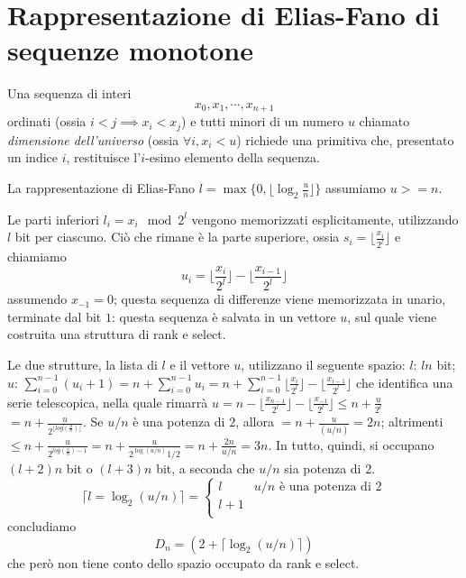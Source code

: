 \section{Rappresentazione di Elias-Fano di sequenze monotone}
Una sequenza di interi
$$
	x_0, x_1, \cdots, x_{n+1}
$$
ordinati (ossia $i < j \implies x_i < x_j$) e tutti minori di un numero $u$ chiamato
\textit{dimensione dell'universo} (ossia $\forall i, x_i < u$) richiede una primitiva che, presentato
un indice $i$, restituisce l'$i$-esimo elemento della sequenza.

La rappresentazione di Elias-Fano
$l = \max\{0, \lfloor \log_2{\frac{u}{n}}\rfloor\}$ assumiamo $u >= n$.

Le parti inferiori $l_i = x_i \mod 2^l$ vengono memorizzati esplicitamente, utilizzando $l$ bit per ciascuno.
Ciò che rimane è la parte superiore, ossia $s_i = \lfloor{\frac{x_{i}}{2^l}}\rfloor$ e chiamiamo
$$
	u_i = \lfloor{\frac{x_i}{2^l}}\rfloor -\lfloor{\frac{x_{i-1}}{2^l}}\rfloor
$$
assumendo $x_{-1} = 0$; questa sequenza di differenze viene memorizzata in unario, terminate dal bit $1$:
questa sequenza è salvata in un vettore $u$, sul quale viene costruita una struttura di rank e select.

Le due strutture, la lista di $l$ e il vettore $u$, utilizzano il seguente spazio:
$l$: $ln$ bit; $u$: $\sum_{i = 0}^{ n-1} (u_i + 1) = n + \sum_{i = 0}^{n-1} u_i = n + \sum_{i = 0}^{n-1} \lfloor{\frac{x_i}{2^l}}\rfloor -\lfloor{\frac{x_{i-1}}{2^l}}\rfloor$
che identifica una serie telescopica, nella quale rimarrà $u = n - \lfloor{\frac{x_{n-1}}{2^l}}\rfloor -\lfloor{\frac{x_{-1}}{2^l}}\rfloor \leq n + \frac{u}{2^l}$
$ = n + \frac{u}{2^{\lfloor log(\frac{u}{n})\rfloor}}$.
Se $u/n$ è una potenza di $2$, allora
$ = n + \frac{u}{(u/n)} = 2n$;
altrimenti
$ \leq n + \frac{u}{2^{log(\frac{u}{n}) - 1 }} = n + \frac{u}{2^{\log(u/n)}1/2} = n + \frac{2n}{u/n} = 3n$.
In tutto, quindi, si occupano
$(l+2)n$ bit o $(l+3)n$ bit, a seconda che $u/n$ sia potenza di $2$.
$$
	\lceil l = \log_2(u/n) \rceil =
	\begin{cases}
		l & u/n \text{ è una potenza di } 2 \\
		l +1                                \\
	\end{cases}
$$
concludiamo
$$
	D_n = (2 + \lceil \log_2(u/n) \rceil)
$$
che però non tiene conto dello spazio occupato da rank e select.

